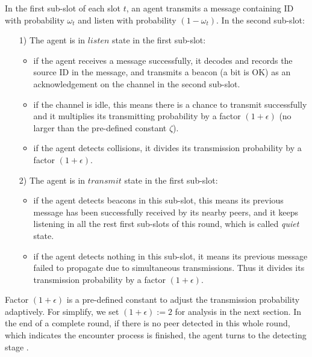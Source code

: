 In the first sub-slot of each slot $t$, an agent transmits a message containing ID 
with probability $\omega_t$ and listen with probability $(1 - \omega_t)$. 
In the second sub-slot: 
\begin{itemize}
    \item[1)] The agent is in $listen$ state in the first sub-slot:
    \begin{itemize}
    \item if the agent receives a message successfully, it 
    decodes and records the source ID in the message, and
    transmits a beacon (a bit is OK) as an acknowledgement 
    on the channel in the second sub-slot. 
    \item if the channel is idle, this means there is a chance to 
    transmit successfully and it multiplies its transmitting 
    probability by a factor $(1+\epsilon)$ (no larger than the pre-defined constant $\zeta$).
    \item if the agent detects collisions, it divides its transmission 
    probability by a factor ${(1+\epsilon)}$. 
    \end{itemize}
    \item[2)] The agent is in $transmit$ state in the first sub-slot:
    \begin{itemize}
    \item if the agent detects beacons in this sub-slot,
    this means its previous message has been successfully received by its nearby
    peers, and it keeps listening in all the rest first sub-slots of this round,
    which is called \emph{quiet} state.
    \item if the agent detects nothing in this sub-slot, it means its previous message
    failed to propagate due to simultaneous transmissions. Thus it divides its transmission 
    probability by a factor ${(1+\epsilon)}$. 
    \end{itemize}
\end{itemize}

Factor ${(1+\epsilon)}$ is a pre-defined constant to adjust the transmission probability adaptively.
For simplify, we set $(1+\epsilon) := 2$ for analysis in the next section.
In the end of a complete round, if there is no peer detected in this whole round, 
which indicates the encounter process is finished, the agent turns to the detecting stage .






